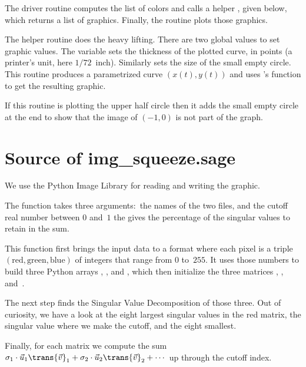 The driver routine computes the list of colors and 
calls a helper , 
given below, which returns a list of graphics.
Finally, the routine plots those graphics.


The helper routine does the heavy lifting.
There are two global values to set graphic values.
The variable  sets the thickness of 
the plotted curve, in points (a printer's unit, here $1/72$~inch).
Similarly  sets the size of the small empty circle.
This routine produces a parametrized curve $(x(t),y(t))$ and uses \Sage's
 function to get the resulting graphic.

If this routine is plotting the upper half circle then it adds the
small empty circle at the end to show that the image of $(-1,0)$
is not part of the graph.




\section{Source of img\_squeeze.sage}
We use the Python Image Library for reading and writing the graphic.

The function
takes three arguments:~the names of the two files, and
the cutoff real number between $0$ and~$1$ the gives the percentage 
of the singular values to retain in the sum.


This function first brings the input data to a format where each
pixel is a triple 
$(\text{red}, \text{green},\text{blue})$ of integers that range from 
$0$ to~$255$.
It uses those numbers to build 
three Python arrays , ,
and , which then initialize the 
three \Sage{} matrices ,
, and~.


The next step finds the Singular Value Decomposition of those three.
Out of curiosity, we have a look at the eight largest singular
values in the red matrix, the singular value where we make the cutoff,
and the eight smallest.


Finally, for each matrix we compute the sum
$\sigma_1\cdot\vec{u}_1\trans{\vec{v}}_1+\sigma_2\cdot\vec{u}_2\trans{\vec{v}}_2
   +\cdots$
up through the cutoff index.


